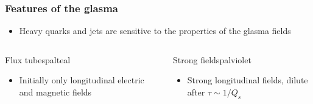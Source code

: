 \documentclass[aspectratio=169,11pt,usenames,dvipsnames]{beamer}
\begin{document}

\begin{frame}
    \frametitle{Features of the glasma}
    \begin{itemize}\itemsep0em 
        \item \begin{center}Heavy quarks and jets are sensitive to the properties of the glasma fields\end{center}
    \end{itemize}
    \vspace{-10pt}
    \begin{columns}[onlytextwidth,t]

        \begin{custombox2}{{\normalsize Flux tubes}}{palteal}
            \begin{varwidth}{0.99\columnwidth}
            \begin{itemize}\itemsep0em 
                \scriptsize
                \item Initially only longitudinal electric and magnetic fields
            \end{itemize}
            \end{varwidth}
        \end{custombox2}

       \begin{custombox2}{{\normalsize Strong fields}}{palviolet}
            \begin{varwidth}{0.95\columnwidth}
            \begin{itemize}\itemsep0em 
                \scriptsize
                \item Strong longitudinal fields, dilute after $\tau\sim 1/Q_s$
            \end{itemize}
            \end{varwidth}
        \end{custombox2}


\end{columns}
\end{frame}
\end{document}
